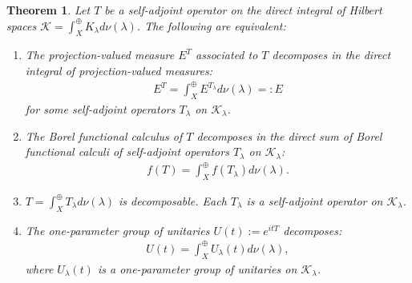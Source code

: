 \documentclass[12pt]{article}
\def\K{{\mathcal K}}
\def\l{\lambda}
\newtheorem{theorem}{Theorem}[section]
\theoremstyle{remark}
\begin{document}
		\begin{theorem}\label{prop:functional-calculus-decomposable}
			Let $T$ be a self-adjoint operator on the direct integral of Hilbert spaces $\K=\int^\oplus_X K_\l d\nu(\l)$.
			The following are equivalent:	
				\begin{enumerate}
					\item\label{4} The projection-valued measure $E^T$ associated to $T$ decomposes in the direct integral of projection-valued measures:
						\begin{align}\label{eq:decomposed-spectral-measure}
							E^T=\int^\oplus_X E^{T_\l}d\nu(\l)=:E
						\end{align}
					for some self-adjoint operators $T_\l$ on $\K_\l$.
					\item\label{3} The Borel functional calculus of $T$ decomposes in the direct sum of Borel functional calculi of self-adjoint operators $T_\l$ on $\K_\l$:
						\begin{align*}
							f(T)=\int^\oplus_X f(T_\l)d\nu(\l).
						\end{align*}
					\item\label{1} $T=\int^\oplus_X T_\l d\nu(\l)$ is decomposable. Each $T_\l$ is a self-adjoint operator on $\K_\l$.
					\item\label{2} The one-parameter group of unitaries $U(t):=e^{itT}$ decomposes:
						\begin{align*}
							U(t)=\int^\oplus_X U_\l(t)d\nu(\l),
						\end{align*}
					where $U_\l(t)$ is a one-parameter group of unitaries on $\K_\l$.
					
				
				\end{enumerate}
		\end{theorem}	
\end{document}
